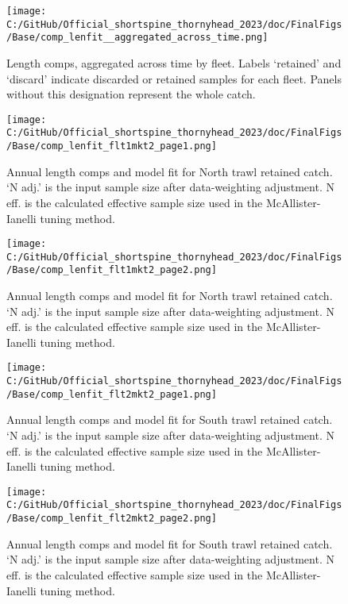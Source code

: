 \documentclass[11pt,
  english,
  letterpaper,
]{article}
\begin{document}
\begin{figure}
\centering
\texttt{[image: C:/GitHub/Official\_shortspine\_thornyhead\_2023/doc/FinalFigs/Base/comp\_lenfit\_\_aggregated\_across\_time.png]}
\caption{Length comps, aggregated across time by fleet. Labels `retained' and `discard' indicate discarded or retained samples for each fleet. Panels without this designation represent the whole catch.\label{fig:lencomps_all}}
\end{figure}

\begin{figure}
\centering
\texttt{[image: C:/GitHub/Official\_shortspine\_thornyhead\_2023/doc/FinalFigs/Base/comp\_lenfit\_flt1mkt2\_page1.png]}
\caption{Annual length comps and model fit for North trawl retained catch. `N adj.' is the input sample size after data-weighting adjustment. N eff. is the calculated effective sample size used in the McAllister-Ianelli tuning method.\label{fig:ntrawl_comps_1}}
\end{figure}

\begin{figure}
\centering
\texttt{[image: C:/GitHub/Official\_shortspine\_thornyhead\_2023/doc/FinalFigs/Base/comp\_lenfit\_flt1mkt2\_page2.png]}
\caption{Annual length comps and model fit for North trawl retained catch. `N adj.' is the input sample size after data-weighting adjustment. N eff. is the calculated effective sample size used in the McAllister-Ianelli tuning method.\label{fig:ntrawl_comps_2}}
\end{figure}

\begin{figure}
\centering
\texttt{[image: C:/GitHub/Official\_shortspine\_thornyhead\_2023/doc/FinalFigs/Base/comp\_lenfit\_flt2mkt2\_page1.png]}
\caption{Annual length comps and model fit for South trawl retained catch. `N adj.' is the input sample size after data-weighting adjustment. N eff. is the calculated effective sample size used in the McAllister-Ianelli tuning method.\label{fig:strawl_comps_1}}
\end{figure}

\begin{figure}
\centering
\texttt{[image: C:/GitHub/Official\_shortspine\_thornyhead\_2023/doc/FinalFigs/Base/comp\_lenfit\_flt2mkt2\_page2.png]}
\caption{Annual length comps and model fit for South trawl retained catch. `N adj.' is the input sample size after data-weighting adjustment. N eff. is the calculated effective sample size used in the McAllister-Ianelli tuning method.\label{fig:strawl_comps_2}}
\end{figure}
\end{document}
